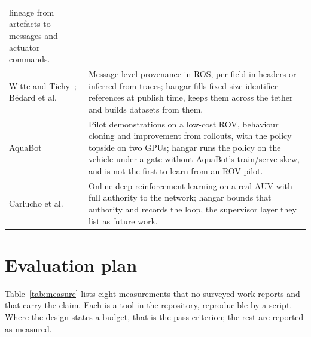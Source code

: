 \documentclass[conference]{IEEEtran}
\begin{document}
\begin{table}[t]
\begin{tabular}{@{}L{0.17\textwidth}L{0.79\textwidth}@{}}
lineage from artefacts to messages and actuator commands. \\
Witte and Tichy~\cite{witte2021provenance}; Bédard et
al.~\cite{bedard2023messageflow} &
Message-level provenance in ROS, per field in headers or inferred from
traces; hangar fills fixed-size identifier references at publish time, keeps
them across the tether and builds datasets from them. \\
AquaBot~\cite{liu2025aquabot} &
Pilot demonstrations on a low-cost ROV, behaviour cloning and improvement
from rollouts, with the policy topside on two GPUs; hangar runs the policy on
the vehicle under a gate without AquaBot's train/serve skew, and is not the
first to learn from an ROV pilot. \\
Carlucho et al.~\cite{carlucho2018adaptive} &
Online deep reinforcement learning on a real AUV with full authority to the
network; hangar bounds that authority and records the loop, the supervisor
layer they list as future work. \\
\bottomrule
\end{tabular}
\end{table}

\section{Evaluation plan}

Table~\ref{tab:measure} lists eight measurements that no surveyed work
reports and that carry the claim. Each is a tool in the repository,
reproducible by a script. Where the design states a budget, that is the pass
criterion; the rest are reported as measured.
\end{document}
